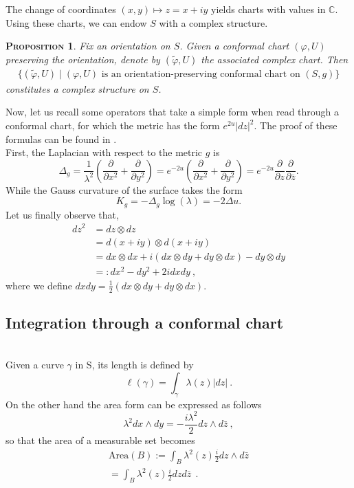 \documentclass[a4paper,11pt,openright,twoside]{book}
\newcommand{\C}{\mathbb{C}}
\newcommand{\1}{\mathds{1}}
\theoremstyle{plain}
\newtheorem{prop}[thm]{\textsc{Proposition}}
\theoremstyle{definition}
\theoremstyle{remark}
\begin{document}
The change of coordinates $(x,y)\mapsto z=x+iy$ yields charts with values in $\C$. Using these charts, we can endow $S$ with a complex structure.
\begin{prop}
	Fix an orientation on $S$. Given a conformal chart $(\varphi,U)$ preserving the orientation, denote by $(\tilde\varphi,U)$ the associated complex chart. Then
	\begin{align*}
		\{(\tilde\varphi,U)\mid (\varphi,U)\text{ is an orientation-preserving conformal chart on }(S,g)\}
	\end{align*}
	constitutes a complex structure on $S$.
\end{prop}
Now, let us recall some operators that take a simple form when read through a conformal chart, for which the metric has the form $e^{2u}|dz|^2$. The proof of these formulas can be found in \cite{jost2006compact}.\\
First, the Laplacian with respect to the metric $g$ is
\[\Delta_g = \frac{1}{\lambda^2}(\frac{\partial  }{\partial x^2} +\frac{\partial }{\partial y^2} ) = e^{-2u}(\frac{\partial  }{\partial x^2} + \frac{\partial  }{\partial y^2} ) = e^{-2u}\frac{\partial  }{\partial z} \frac{\partial  }{\partial \overline{z}} .\] 
While the Gauss curvature of the surface takes the form
\[K_g = -\Delta_g\log(\lambda) = -2\Delta u.\]
Let us finally observe that,
\begin{align*}
	dz^2 &= dz\otimes dz\\
		&= d(x+iy) \otimes d(x+iy)\\
		&= dx \otimes dx +i \left( dx \otimes dy + dy \otimes dx \right) - dy \otimes dy\\
		&=: dx^2 - dy^2 +2i dxdy
\ ,
\end{align*}
where we define $dxdy = \frac{1}{2} (dx\otimes dy+dy \otimes dx) $.
\subsection{Integration through a conformal chart}\mbox{}\\
Given a curve $\gamma$ in S, its length is defined by
\[ \ell(\gamma) = \int_\gamma \lambda(z) |dz|\ .\] 
On the other hand the area form can be expressed as follows
\[ \lambda^2 dx\wedge dy = -\frac{i\lambda^2}{2} dz\wedge d\bar z\ ,\] so that the area of a measurable set becomes
\begin{align*}
	\mathrm{Area}(B):=\int_{B}\lambda^{2}(z)\frac{i}{2}dz\wedge d\bar{z}\\
	= \int_{B}\lambda^{2}(z)\frac{i}{2}dzd\bar{z}
\ \ . 
\end{align*}	
\end{document}
